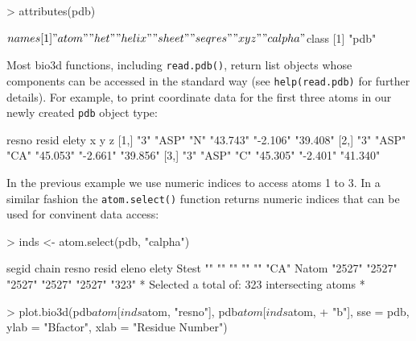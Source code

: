 \documentclass[a4paper]{article}
\begin{document}
\begin{Schunk}
\begin{Sinput}
> attributes(pdb)
\end{Sinput}
\begin{Soutput}
$names
[1] "atom"   "het"    "helix"  "sheet"  "seqres" "xyz"    "calpha"

$class
[1] "pdb"
\end{Soutput}
\end{Schunk}
Most bio3d functions, including \texttt{read.pdb()}, return list objects whose components can be accessed in the standard way (see \texttt{help(read.pdb)} for further details).  For example, to print coordinate data for the first three atoms in our newly created \texttt{pdb} object type:

\begin{Schunk}
\begin{Soutput}
     resno resid elety x        y        z       
[1,] "3"   "ASP" "N"   "43.743" "-2.106" "39.408"
[2,] "3"   "ASP" "CA"  "45.053" "-2.661" "39.856"
[3,] "3"   "ASP" "C"   "45.305" "-2.401" "41.340"
\end{Soutput}
\end{Schunk}
In the previous example we use numeric indices to access atoms 1 to 3. In a similar fashion the \texttt{atom.select()} function returns numeric indices that can be used for convinent data access: 
\begin{Schunk}
\begin{Sinput}
> inds <- atom.select(pdb, "calpha")
\end{Sinput}
\begin{Soutput}
      segid  chain  resno  resid  eleno  elety
Stest ""     ""     ""     ""     ""     "CA" 
Natom "2527" "2527" "2527" "2527" "2527" "323"
 *  Selected a total of: 323 intersecting atoms  *
\end{Soutput}
\begin{Sinput}
> plot.bio3d(pdb$atom[inds$atom, "resno"], pdb$atom[inds$atom, 
+     "b"], sse = pdb, ylab = "Bfactor", xlab = "Residue Number")
\end{Sinput}
\end{Schunk}
\end{document}
